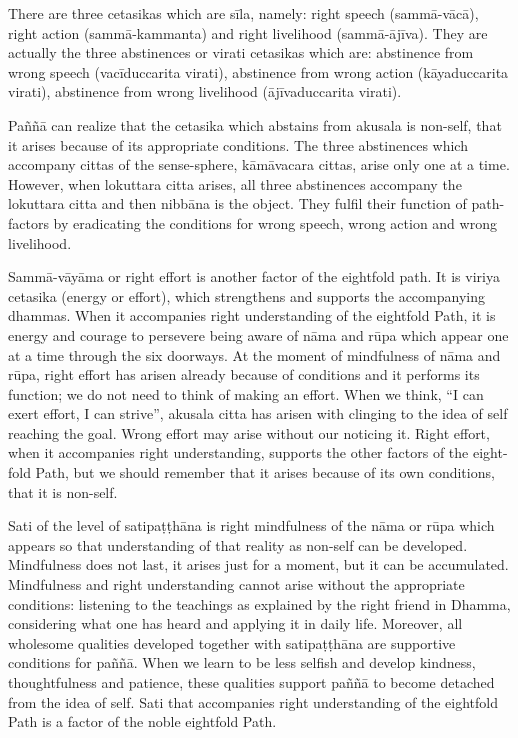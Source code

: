 There are three cetasikas which are sīla, namely: right speech
(sammā-vācā), right action (sammā-kammanta) and right livelihood
(sammā-ājīva). They are actually the three abstinences or virati
cetasikas which are: abstinence from wrong speech (vacīduccarita
virati), abstinence from wrong action (kāyaduccarita virati),
abstinence from wrong livelihood (ājīvaduccarita virati).

Paññā can realize that the cetasika which abstains from akusala is
non-self, that it arises because of its appropriate conditions. The
three abstinences which accompany cittas of the sense-sphere,
kāmāvacara cittas, arise only one at a time. However, when lokuttara
citta arises, all three abstinences accompany the lokuttara citta and
then nibbāna is the object. They fulfil their function of path-factors
by eradicating the conditions for wrong speech, wrong action and wrong
livelihood.

Sammā-vāyāma or right effort is another factor of the eightfold path. It
is viriya cetasika (energy or effort), which strengthens and supports
the accompanying dhammas. When it accompanies right understanding of the
eightfold Path, it is energy and courage to persevere being aware of
nāma and rūpa which appear one at a time through the six doorways. At
the moment of mindfulness of nāma and rūpa, right effort has arisen
already because of conditions and it performs its function; we do not
need to think of making an effort. When we think, ``I can exert effort,
I can strive'', akusala citta has arisen with clinging to the idea of
self reaching the goal. Wrong effort may arise without our noticing it.
Right effort, when it accompanies right understanding, supports the
other factors of the eight-fold Path, but we should remember that it
arises because of its own conditions, that it is non-self.

Sati of the level of satipaṭṭhāna is right mindfulness of the nāma or
rūpa which appears so that understanding of that reality as non-self can
be developed. Mindfulness does not last, it arises just for a moment,
but it can be accumulated. Mindfulness and right understanding cannot
arise without the appropriate conditions: listening to the teachings as
explained by the right friend in Dhamma, considering what one has heard
and applying it in daily life. Moreover, all wholesome qualities
developed together with satipaṭṭhāna are supportive conditions for
paññā. When we learn to be less selfish and develop kindness,
thoughtfulness and patience, these qualities support paññā to become
detached from the idea of self. Sati that accompanies right
understanding of the eightfold Path is a factor of the noble eightfold
Path.

